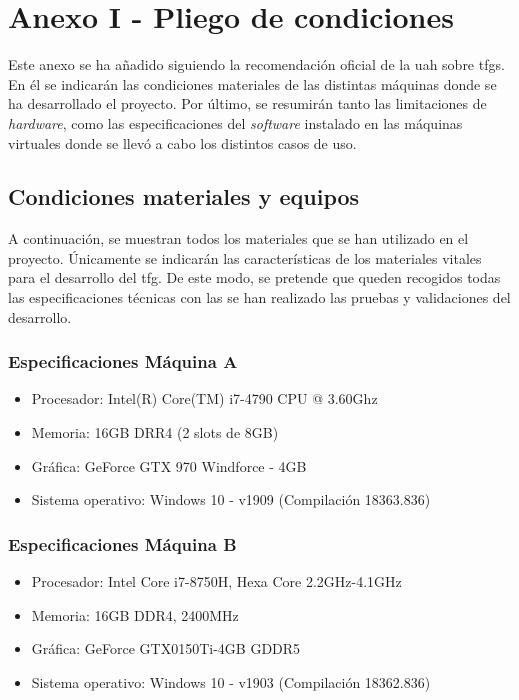 \chapter{Anexo I - Pliego de condiciones}

Este anexo se ha añadido siguiendo la recomendación oficial de la \gls{uah} sobre \gls{tfg}s. En él se indicarán las condiciones materiales de las distintas máquinas donde se ha desarrollado el proyecto. Por último, se resumirán tanto las limitaciones de \textit{hardware}, como las especificaciones del \textit{software} instalado en las máquinas virtuales donde se llevó a cabo los distintos casos de uso. 

\section{Condiciones materiales y equipos}

A continuación, se muestran todos los materiales que se han utilizado en el proyecto. Únicamente se indicarán las características de los materiales vitales para el desarrollo del \gls{tfg}. De este modo, se pretende que queden recogidos todas las especificaciones técnicas con las se han realizado las pruebas y validaciones del desarrollo.

\subsection{Especificaciones Máquina A}
\label{maquina_A}
    \begin{itemize}
        \item Procesador: Intel(R) Core(TM) i7-4790 CPU @ 3.60Ghz
        \item Memoria: 16GB DRR4 (2 slots de 8GB)
        \item Gráfica: GeForce GTX 970 Windforce - 4GB
        \item Sistema operativo: Windows 10 - v1909 (Compilación 18363.836)
    \end{itemize}
    
\subsection{Especificaciones Máquina B}
\label{maquina_B}
    \begin{itemize}
        \item Procesador: Intel Core i7-8750H, Hexa Core 2.2GHz-4.1GHz
        \item Memoria: 16GB DDR4, 2400MHz
        \item Gráfica: GeForce GTX0150Ti-4GB GDDR5
        \item Sistema operativo: Windows 10 - v1903 (Compilación 18362.836)
    \end{itemize}


